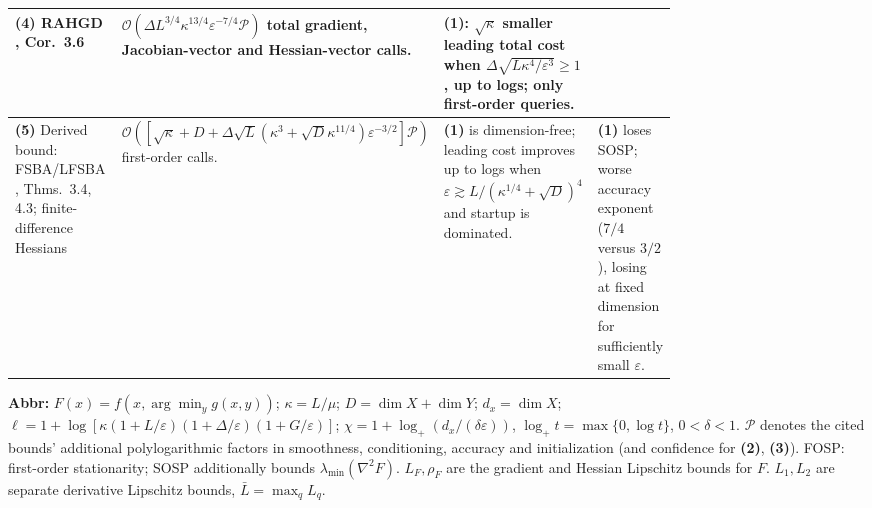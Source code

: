 \begin{table}[tp]
\begin{threeparttable}
\begin{tabularx}{\linewidth}{@{}>{\raggedright\arraybackslash}p{0.20\linewidth}>{\raggedright\arraybackslash}p{0.32\linewidth}>{\raggedright\arraybackslash}p{0.25\linewidth}>{\raggedright\arraybackslash}X@{}}
\midrule
\textbf{(4)} RAHGD \citep{hsbYangV1}, Cor.~3.6 & $\mathcal{O}(\Delta L^{3/4}\kappa^{13/4}\varepsilon^{-7/4}\mathcal P)$ total gradient, Jacobian-vector and Hessian-vector calls. & \textbf{(1)}: $\sqrt\kappa$ smaller leading total cost when $\Delta\sqrt{L\kappa^4/\varepsilon^3}\ge1$, up to logs; only first-order queries. & \\
\midrule
\textbf{(5)} Derived bound: FSBA/LFSBA \citep{hsbYangSecondV1}, Thms.~3.4, 4.3; finite-difference Hessians & $\mathcal{O}\!\left([\sqrt\kappa+D+\Delta\sqrt L(\kappa^3+\sqrt D\kappa^{11/4})\varepsilon^{-3/2}]\mathcal P\right)$ first-order calls. & \textbf{(1)} is dimension-free; leading cost improves up to logs when $\varepsilon\gtrsim L/(\kappa^{1/4}+\sqrt D)^4$ and startup is dominated. & \textbf{(1)} loses SOSP; worse accuracy exponent ($7/4$ versus $3/2$), losing at fixed dimension for sufficiently small $\varepsilon$. \\
\bottomrule
\end{tabularx}
\begin{tablenotes}[flushleft]\footnotesize
\item[] \textbf{Abbr:} $F(x)=f(x,\arg\min_y g(x,y))$; $\kappa=L/\mu$; $D=\dim X+\dim Y$; $d_x=\dim X$; $\ell=1+\log[\kappa(1+L/\varepsilon)(1+\Delta/\varepsilon)(1+G/\varepsilon)]$; $\chi=1+\log_+(d_x/(\delta\varepsilon))$, $\log_+t=\max\{0,\log t\}$, $0<\delta<1$. $\mathcal P$ denotes the cited bounds' additional polylogarithmic factors in smoothness, conditioning, accuracy and initialization (and confidence for \textbf{(2)}, \textbf{(3)}). FOSP: first-order stationarity; SOSP additionally bounds $\lambda_{\min}(\nabla^2F)$. $L_F,\rho_F$ are the gradient and Hessian Lipschitz bounds for $F$. $L_1,L_2$ are separate derivative Lipschitz bounds, $\bar L=\max_q L_q$.
\end{tablenotes}
\end{threeparttable}
\end{table}
\clearpage
